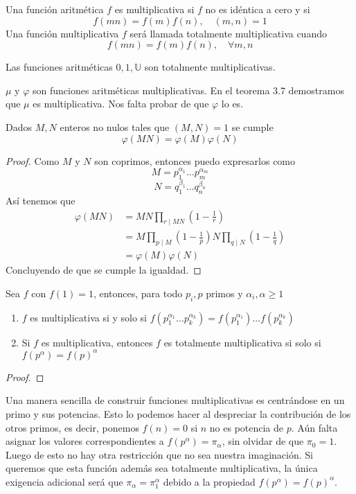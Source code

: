 \documentclass[main.tex]{subfiles}
\begin{document}
\begin{defn}
Una funci\'on aritm\'etica $f$ es multiplicativa si $f$ no es id\'entica a cero y si
$$f(mn) = f(m)f(n),\quad (m, n) = 1$$
Una funci\'on multiplicativa $f$ ser\'a llamada totalmente multiplicativa cuando
$$f(mn) = f(m)f(n),\quad\forall m, n$$
\end{defn}
\begin{example}
Las funciones aritm\'eticas $0, 1, \mathbb U$ son totalmente multiplicativas.
\end{example}

\begin{example}
$\mu$ y $\varphi$ son funciones aritm\'eticas multiplicativas. En el teorema 3.7 demostramos que $\mu$ es multiplicativa. Nos falta probar de que $\varphi$ lo es.
\end{example}
\begin{theorem}
Dados $M, N$ enteros no nulos tales que $(M, N)=1$ se cumple
$$\varphi(MN) = \varphi(M)\varphi(N)$$
\end{theorem}
\begin{proof}
Como $M$ y $N$ son coprimos, entonces puedo expresarlos como
$$M = p_1^{\alpha_1} \dots p_m^{\alpha_m}$$
$$N = q_1^{\beta_1} \dots q_n^{\beta_n}$$
As\'i tenemos que
\begin{align*}
    \varphi(MN) &= MN \prod_{r \mid MN} (1 - \frac{1}{r})\\
    &= M\prod_{p \mid M}(1 - \frac{1}{p})N\prod_{q \mid N}(1 - \frac{1}{q})\\
    &= \varphi(M)\varphi(N)
\end{align*}
Concluyendo de que se cumple la igualdad.
\end{proof}
\begin{theorem}
Sea $f$ con $f(1)=1$, entonces, para todo $p_i, p$ primos y $\alpha_i, \alpha \geq 1$
\begin{enumerate}
    \item $f$ es multiplicativa si y solo si $f(p_1^{\alpha_1}\dots p_k^{\alpha_k})=f(p_1^{\alpha_1})\dots f(p_k^{\alpha_k})$
    \item Si $f$ es multiplicativa, entonces $f$ es totalmente multiplicativa si solo si $f(p^\alpha)=f(p)^\alpha$
\end{enumerate}
\end{theorem}
\begin{proof}
\end{proof}
Una manera sencilla de construir funciones multiplicativas es centr\'andose en un primo y sus potencias. Esto lo podemos hacer al despreciar la contribuci\'on de los otros primos, es decir, ponemos $f(n) = 0$ si $n$ no es potencia de $p$. A\'un falta asignar los valores correspondientes a $f(p^\alpha) = \pi_\alpha$, sin olvidar de que $\pi_0 = 1$. Luego de esto no hay otra restricci\'on que no sea nuestra imaginaci\'on. Si queremos que esta funci\'on adem\'as sea totalmente multiplicativa, la \'unica exigencia adicional ser\'a que $\pi_\alpha = \pi_1^\alpha$ debido a la propiedad $f(p^\alpha) = f(p)^\alpha$.
\end{document}
